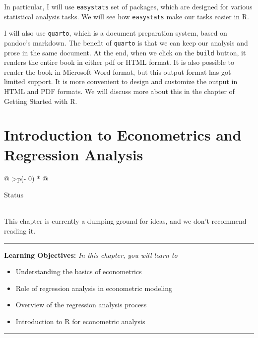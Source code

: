 \documentclass[
  letterpaper,
  paper =a4,
  twoside,
  openright,
  headsepline,
  footsepline,
  listof = totocnumbered,
  chapterprefix = true,
  firstiscover]{scrbook}
\providecommand{\abstractname}{Learning Objectives} %
\newenvironment{objectives}[1]{%
	\hrule
	\vspace{5pt}
	\small\textbf{\abstractname: } 
	\newline
	\vspace{0.1cm}
	\small\emph{#1} %
	\itshape %
}{%
	\vspace{5pt}
	\hrule
	\vspace{0.6cm}
}
\begin{document}
In particular, I will use \texttt{easystats} set of packages, which are
designed for various statistical analysis tasks. We will see how
\texttt{easystats} make our tasks easier in R.

I will also use \texttt{quarto}, which is a document preparation system,
based on pandoc's markdown. The benefit of \texttt{quarto} is that we
can keep our analysis and prose in the same document. At the end, when
we click on the \texttt{build} button, it renders the entire book in
either pdf or HTML format. It is also possible to render the book in
Microsoft Word format, but this output format has got limited support.
It is more convenient to design and customize the output in HTML and PDF
formats. We will discuss more about this in the chapter of Getting
Started with R.


\hypertarget{introduction-to-econometrics-and-regression-analysis}{%
\chapter{Introduction to Econometrics and Regression
Analysis}\label{introduction-to-econometrics-and-regression-analysis}}

\begin{longtable}[]{@{}
  >{\centering\arraybackslash}p{(\columnwidth - 0\tabcolsep) * }@{}}
\toprule\noalign{}
\begin{minipage}[b]{\linewidth}\centering
Status
\end{minipage} \\
\midrule\noalign{}
\endhead
\bottomrule\noalign{}
\endlastfoot
This chapter is currently a dumping ground for ideas, and we don't
recommend reading it. \\
\end{longtable}

\begin{objectives}{In this chapter, you will learn to}
\begin{itemize}

\item{Understanding the basics of econometrics}

\item{Role of regression analysis in econometric modeling}

\item{Overview of the regression analysis process}

\item{Introduction to R for econometric analysis}

\end{itemize}

\end{objectives}
\end{document}
